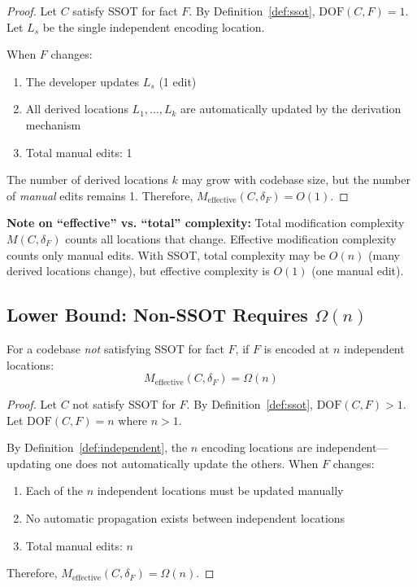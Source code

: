 \begin{proof}
Let $C$ satisfy SSOT for fact $F$. By Definition~\ref{def:ssot}, $\text{DOF}(C, F) = 1$. Let $L_s$ be the single independent encoding location.

When $F$ changes:
\begin{enumerate}
\tightlist
\item The developer updates $L_s$ (1 edit)
\item All derived locations $L_1, \ldots, L_k$ are automatically updated by the derivation mechanism
\item Total manual edits: 1
\end{enumerate}

The number of derived locations $k$ may grow with codebase size, but the number of \emph{manual} edits remains 1. Therefore, $M_{\text{effective}}(C, \delta_F) = O(1)$.
\end{proof}

\textbf{Note on ``effective'' vs. ``total'' complexity:} Total modification complexity $M(C, \delta_F)$ counts all locations that change. Effective modification complexity counts only manual edits. With SSOT, total complexity may be $O(n)$ (many derived locations change), but effective complexity is $O(1)$ (one manual edit).

\subsection{Lower Bound: Non-SSOT Requires \texorpdfstring{$\Omega(n)$}{Omega(n)}}\label{sec:lower-bound}

\begin{theorem}\label{thm:lower-bound}
For a codebase \emph{not} satisfying SSOT for fact $F$, if $F$ is encoded at $n$ independent locations:
\[
M_{\text{effective}}(C, \delta_F) = \Omega(n)
\]
\end{theorem}

\begin{proof}
Let $C$ not satisfy SSOT for $F$. By Definition~\ref{def:ssot}, $\text{DOF}(C, F) > 1$. Let $\text{DOF}(C, F) = n$ where $n > 1$.

By Definition~\ref{def:independent}, the $n$ encoding locations are independent---updating one does not automatically update the others. When $F$ changes:
\begin{enumerate}
\tightlist
\item Each of the $n$ independent locations must be updated manually
\item No automatic propagation exists between independent locations
\item Total manual edits: $n$
\end{enumerate}

Therefore, $M_{\text{effective}}(C, \delta_F) = \Omega(n)$.
\end{proof}

